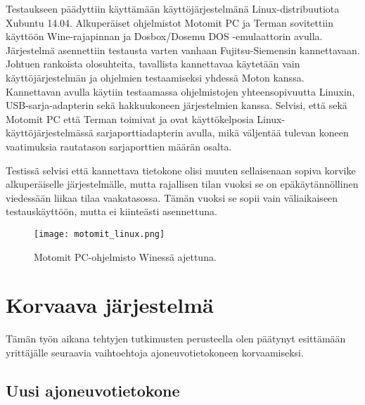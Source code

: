 Testaukseen päädyttiin käyttämään käyttöjärjestelmänä Linux-distribuutiota Xubuntu 14.04. Alkuperäiset ohjelmistot Motomit PC ja Terman sovitettiin käyttöön Wine-rajapinnan ja Dosbox/Dosemu DOS -emulaattorin avulla. Järjestelmä asennettiin testausta varten vanhaan Fujitsu-Siemensin kannettavaan. Johtuen rankoista olosuhteita, tavallista kannettavaa käytetään vain käyttöjärjestelmän ja ohjelmien testaamiseksi yhdessä Moton kanssa. Kannettavan avulla käytiin testaamassa ohjelmistojen yhteensopivuutta Linuxin, USB-sarja-adapterin sekä hakkuukoneen järjestelmien kanssa. Selvisi, että sekä Motomit PC että Terman toimivat ja ovat käyttökelposia Linux-käyttöjärjestelmässä sarjaporttiadapterin avulla, mikä väljentää tulevan koneen vaatimuksia rautatason sarjaporttien määrän osalta.

Testissä selvisi että kannettava tietokone olisi muuten sellaisenaan sopiva korvike alkuperäiselle järjestelmälle, mutta rajallisen tilan vuoksi se on epäkäytännöllinen viedessään liikaa tilaa vaakatasossa. Tämän vuoksi se sopii vain väliaikaiseen testauskäyttöön, mutta ei kiinteästi asennettuna.


\begin{figure}[H]
\centering
\texttt{[image: motomit\_linux.png]}
\caption{Motomit PC-ohjelmisto Winessä ajettuna.}
\end{figure}


\newpage

\chapter{Korvaava järjestelmä}
\label{ch:korvaava_jarjestelma}

Tämän työn aikana tehtyjen tutkimusten perusteella olen päätynyt esittämään yrittäjälle seuraavia vaihtoehtoja ajoneuvotietokoneen korvaamiseksi.

\section{Uusi ajoneuvotietokone}

